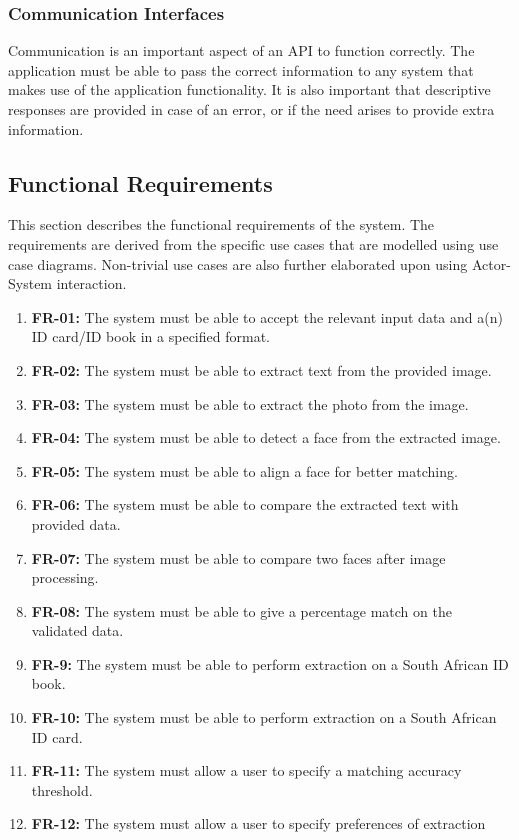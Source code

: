 \documentclass{article}
\begin{document}
		\subsubsection{Communication Interfaces}
		Communication is an important aspect of an API to function correctly. The application must be able to pass the correct information to any system that makes use of the application functionality. It is also important that descriptive responses are provided in case of an error, or if the need arises to provide extra information.\\
			

		\subsection{Functional Requirements}\label{subsec:specific-functional}
		This section describes the functional requirements of the system. The requirements are derived from the specific use cases that are modelled using use case diagrams. Non-trivial use cases are also further elaborated upon using Actor-System interaction.
		
		\begin{enumerate}
		    \item \textbf{FR-01:} The system must be able to accept the relevant input data and a(n) ID card/ID book in a specified format.
		    \item \textbf{FR-02:} The system must be able to extract text from the provided image.
		    \item \textbf{FR-03:} The system must be able to extract the photo from the image.
		    \item \textbf{FR-04:} The system must be able to detect a face from the extracted image.
		    \item \textbf{FR-05:} The system must be able to align a face for better matching.
		    \item \textbf{FR-06:} The system must be able to compare the extracted text with provided data.
		    \item \textbf{FR-07:} The system must be able to compare two faces after image processing.
		    \item \textbf{FR-08:} The system must be able to give a percentage match on the validated data.
		    \item \textbf{FR-9:} The system must be able to perform extraction on a South African ID book.
		    \item \textbf{FR-10:} The system must be able to perform extraction on a South African ID card.
		    \item \textbf{FR-11:} The system must allow a user to specify a matching accuracy threshold.
		    \item \textbf{FR-12:} The system must allow a user to specify preferences of extraction
		\end{enumerate}
		
\end{document}
